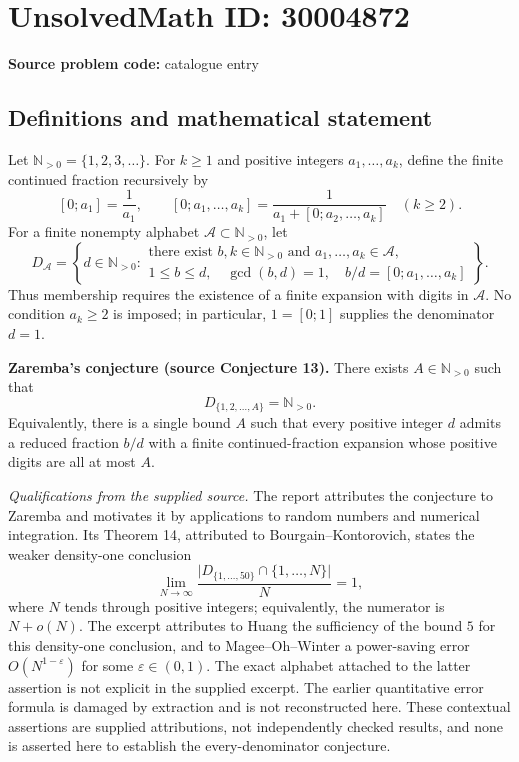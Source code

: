 \documentclass[11pt]{article}
\newcommand{\N}{\mathbb{N}}
\begin{document}
\section*{UnsolvedMath ID: 30004872}
\textbf{Source problem code:} catalogue entry
\subsection{Definitions and mathematical statement}
Let \(\N_{>0}=\{1,2,3,\ldots\}\). For \(k\geq 1\) and positive integers \(a_1,\ldots,a_k\), define the finite continued fraction recursively by
\[
[0;a_1]=\frac{1}{a_1},\qquad
[0;a_1,\ldots,a_k]=\frac{1}{a_1+[0;a_2,\ldots,a_k]}\quad(k\geq2).
\]
For a finite nonempty alphabet \(\mathcal A\subset\N_{>0}\), let
\[
D_{\mathcal A}=\left\{d\in\N_{>0}:\begin{array}{l}
\text{there exist }b,k\in\N_{>0}\text{ and }a_1,\ldots,a_k\in\mathcal A,\\
1\leq b\leq d,\quad \gcd(b,d)=1,\quad b/d=[0;a_1,\ldots,a_k]
\end{array}\right\}.
\]
Thus membership requires the existence of a finite expansion with digits in \(\mathcal A\). No condition \(a_k\geq2\) is imposed; in particular, \(1=[0;1]\) supplies the denominator \(d=1\).

\textbf{Zaremba's conjecture (source Conjecture 13).} There exists \(A\in\N_{>0}\) such that
\[
D_{\{1,2,\ldots,A\}}=\N_{>0}.
\]
Equivalently, there is a single bound \(A\) such that every positive integer \(d\) admits a reduced fraction \(b/d\) with a finite continued-fraction expansion whose positive digits are all at most \(A\).

\textit{Qualifications from the supplied source.} The report attributes the conjecture to Zaremba and motivates it by applications to random numbers and numerical integration. Its Theorem 14, attributed to Bourgain--Kontorovich, states the weaker density-one conclusion
\[
\lim_{N\to\infty}\frac{\lvert D_{\{1,\ldots,50\}}\cap\{1,\ldots,N\}\rvert}{N}=1,
\]
where \(N\) tends through positive integers; equivalently, the numerator is \(N+o(N)\). The excerpt attributes to Huang the sufficiency of the bound \(5\) for this density-one conclusion, and to Magee--Oh--Winter a power-saving error \(O(N^{1-\varepsilon})\) for some \(\varepsilon\in(0,1)\). The exact alphabet attached to the latter assertion is not explicit in the supplied excerpt. The earlier quantitative error formula is damaged by extraction and is not reconstructed here. These contextual assertions are supplied attributions, not independently checked results, and none is asserted here to establish the every-denominator conjecture.
\end{document}
